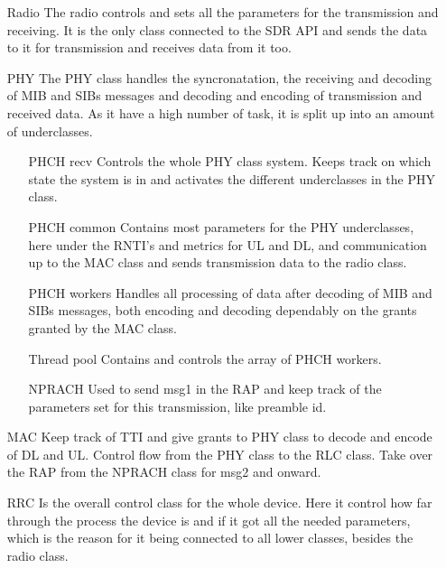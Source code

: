 \begin{itemize}
\item [Radio] The radio controls and sets all the parameters for the transmission and receiving. It is the only class connected to the SDR API and sends the data to it for transmission and receives data from it too. 
\item [PHY] The PHY class handles the syncronatation, the receiving and decoding of MIB and SIBs messages and decoding and encoding of transmission and received data. As it have a high number of task, it is split up into an amount of underclasses.
	\begin{itemize}
	\item [PHCH recv] Controls the whole PHY class system. Keeps track on which state the system is in and activates the different underclasses in the PHY class.
	\item [PHCH common] Contains most parameters for the PHY underclasses, here under the RNTI's and metrics for UL and DL, and communication up to the MAC class and sends transmission data to the radio class.
	\item [PHCH workers] Handles all processing of data after decoding of MIB and SIBs messages, both encoding and decoding dependably on the grants granted by the MAC class.
	\item [Thread pool] Contains and controls the array of PHCH workers.	
	\item [NPRACH] Used to send msg1 in the RAP and keep track of the parameters set for this transmission, like preamble id.
	\end{itemize}
\item [MAC] Keep track of TTI and give grants to PHY class to decode and encode of DL and UL. Control flow from the PHY class to the RLC class. Take over the RAP from the NPRACH class for msg2 and onward.
\item [RRC] Is the overall control class for the whole device. Here it control how far through the process the device is and if it got all the needed parameters, which is the reason for it being connected to all lower classes, besides the radio class.
\end{itemize}


